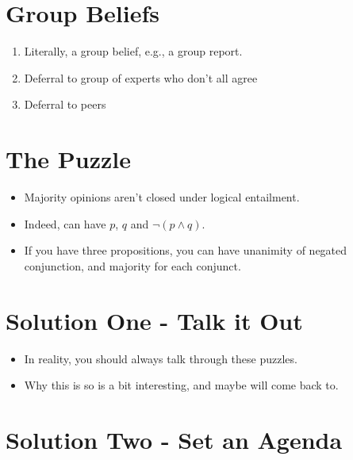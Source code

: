 
\def\mytitle{Group Beliefs}
\def\myauthor{Notes for self}
\def\mydate{March 20, 2018}


\section{Group Beliefs}
\label{groupbeliefs}

\begin{enumerate}
\item{} Literally, a group belief, e.g., a group report.

\item{} Deferral to group of experts who don't all agree

\item{} Deferral to peers

\end{enumerate}
\section{The Puzzle}
\label{thepuzzle}

\begin{itemize}
\item{} Majority opinions aren't closed under logical entailment.

\item{} Indeed, can have $p$, $q$ and $\neg (p \wedge q)$.

\item{} If you have three propositions, you can have unanimity of negated conjunction, and majority for each conjunct.

\end{itemize}
\section{Solution One - Talk it Out}
\label{solutionone-talkitout}

\begin{itemize}
\item{} In reality, you should always talk through these puzzles.

\item{} Why this is so is a bit interesting, and maybe will come back to.

\end{itemize}
\section{Solution Two - Set an Agenda}
\label{solutiontwo-setanagenda}

